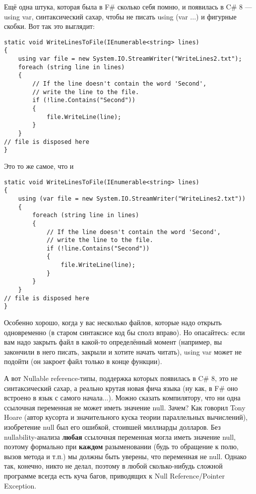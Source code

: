 \documentclass{../../text-style}
\begin{document}
Ещё одна штука, которая была в F\# сколько себя помню, и появилась в C\# 8 --- using var, синтаксический сахар, чтобы не писать using (var ...) и фигурные скобки. Вот так это выглядит:

\begin{verbatim}
static void WriteLinesToFile(IEnumerable<string> lines)
{
    using var file = new System.IO.StreamWriter("WriteLines2.txt");
    foreach (string line in lines)
    {
        // If the line doesn't contain the word 'Second', 
        // write the line to the file.
        if (!line.Contains("Second"))
        {
            file.WriteLine(line);
        }
    }
// file is disposed here
}
\end{verbatim}

Это то же самое, что и

\begin{verbatim}
static void WriteLinesToFile(IEnumerable<string> lines)
{
    using (var file = new System.IO.StreamWriter("WriteLines2.txt")) 
    {
        foreach (string line in lines)
        {
            // If the line doesn't contain the word 'Second', 
            // write the line to the file.
            if (!line.Contains("Second"))
            {
                file.WriteLine(line);
            }
        }
    }
// file is disposed here
}
\end{verbatim}

Особенно хорошо, когда у вас несколько файлов, которые надо открыть одновременно (в старом синтаксисе код бы сполз вправо). Но опасайтесь: если вам надо закрыть файл в какой-то определённый момент (например, вы закончили в него писать, закрыли и хотите начать читать), using var может не подойти (он закроет файл только в конце функции).

А вот Nullable reference-типы, поддержка которых появилась в C\# 8, это не синтаксический сахар, а реально крутая новая фича языка (ну как, в F\# оно встроено в язык с самого начала...). Можно сказать компилятору, что ни одна ссылочная переменная не может иметь значение null. Зачем? Как говорил Tony Hoare (автор кусорта и значительного куска теории параллельных вычислений), изобретение null был его ошибкой, стоившей миллиарды долларов. Без nullability-анализа \textbf{любая} ссылочная переменная могла иметь значение null, поэтому формально при \textbf{каждом} разыменовании (будь то обращение к полю, вызов метода и т.п.) мы должны быть уверены, что переменная не null. Однако так, конечно, никто не делал, поэтому в любой сколько-нибудь сложной программе всегда есть куча багов, приводящих к Null Reference/Pointer Exception.
\end{document}
